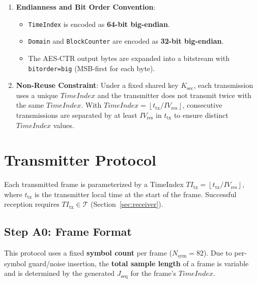 \documentclass[11pt]{article}
\begin{document}
\begin{enumerate}
\begin{enumerate}
\begin{itemize}
\[      \]
      Therefore $j_\ell\in[40,90]$.
    \end{itemize}
  \end{enumerate}
\item \textbf{Endianness and Bit Order Convention}:
  \begin{itemize}
  \item \texttt{TimeIndex} is encoded as \textbf{64-bit big-endian}.
  \item \texttt{Domain} and \texttt{BlockCounter} are encoded as \textbf{32-bit big-endian}.
  \item The AES-CTR output bytes are expanded into a bitstream with \texttt{bitorder=big} (MSB-first for each byte).
  \end{itemize}
\item \textbf{Non-Reuse Constraint}: Under a fixed shared key $K_{\text{sec}}$, each transmission uses a unique $\mathit{TimeIndex}$ and the transmitter does not transmit twice with the same $\mathit{TimeIndex}$. With $\mathit{TimeIndex}=\left\lfloor t_{\text{tx}}/\mathit{IV}_{\text{res}}\right\rfloor$, consecutive transmissions are separated by at least $\mathit{IV}_{\text{res}}$ in $t_{\text{tx}}$ to ensure distinct $\mathit{TimeIndex}$ values.
\end{enumerate}

\section{Transmitter Protocol}

Each transmitted frame is parameterized by a TimeIndex $\mathit{TI}_{\text{tx}}=\left\lfloor t_{\text{tx}}/\mathit{IV}_{\text{res}}\right\rfloor$, where $t_{\text{tx}}$ is the transmitter local time at the start of the frame. Successful reception requires $\mathit{TI}_{\text{tx}}\in\mathcal{T}$ (Section~\ref{sec:receiver}).

\subsection{Step A0: Frame Format}

This protocol uses a fixed \textbf{symbol count} per frame ($N_{\text{sym}}=82$). Due to per-symbol guard/noise insertion, the \textbf{total sample length} of a frame is variable and is determined by the generated $J_{\text{seq}}$ for the frame's $\mathit{TimeIndex}$.
\end{document}
